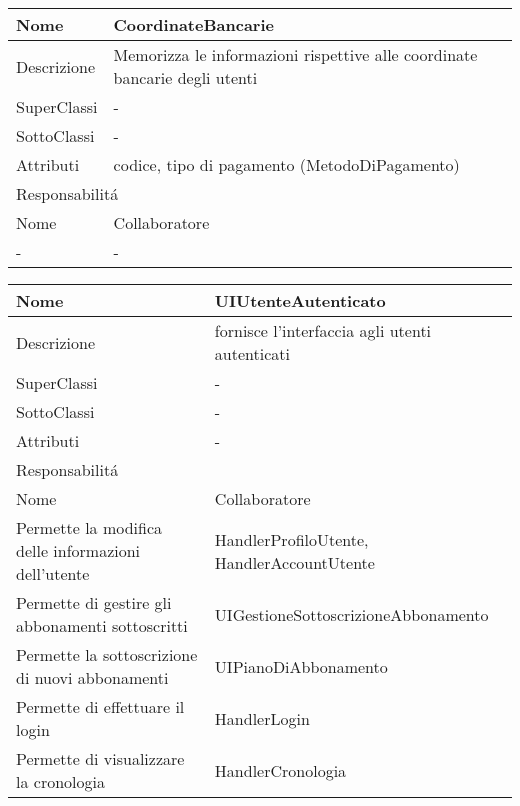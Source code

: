 \begin{center} %
    \begin{longtable}{ |p{3cm}|p{3cm}|p{3cm}|p{3cm}| }
        \hline
        Nome & \multicolumn{3}{|p{9cm}|}{CoordinateBancarie} \\\hline
        Descrizione & \multicolumn{3}{|p{9cm}|}{Memorizza le informazioni rispettive alle coordinate bancarie degli utenti} \\\hline
        SuperClassi & \multicolumn{3}{|p{9cm}|}{-} \\\hline
        SottoClassi & \multicolumn{3}{|p{9cm}|}{-} \\\hline
        Attributi & \multicolumn{3}{|p{9cm}|}{codice, tipo di pagamento (MetodoDiPagamento)} \\\hline
        \multicolumn{4}{|p{12cm}|}{Responsabilit\'a} \\\hline %
        \multicolumn{2}{|p{6cm}|}{Nome} & \multicolumn{2}{|p{6cm}|}{Collaboratore} \\\hline %
        \multicolumn{2}{|p{6cm}|}{-} & \multicolumn{2}{|p{6cm}|}{-} \\\hline
    \end{longtable}
\end{center}

\begin{center} %
    \begin{longtable}{ |p{3cm}|p{3cm}|p{3cm}|p{3cm}| }
        \hline
        Nome & \multicolumn{3}{|p{9cm}|}{UIUtenteAutenticato} \\\hline
        Descrizione & \multicolumn{3}{|p{9cm}|}{fornisce l'interfaccia agli utenti autenticati} \\\hline
        SuperClassi & \multicolumn{3}{|p{9cm}|}{-} \\\hline
        SottoClassi & \multicolumn{3}{|p{9cm}|}{-} \\\hline
        Attributi & \multicolumn{3}{|p{9cm}|}{-} \\\hline
        \multicolumn{4}{|p{12cm}|}{Responsabilit\'a} \\\hline %
        \multicolumn{2}{|p{6cm}|}{Nome} & \multicolumn{2}{|p{6cm}|}{Collaboratore} \\\hline %
        \multicolumn{2}{|p{6cm}|}{Permette la modifica delle informazioni dell'utente} & \multicolumn{2}{|p{6cm}|}{HandlerProfiloUtente, HandlerAccountUtente} \\\hline
        \multicolumn{2}{|p{6cm}|}{Permette di gestire gli abbonamenti sottoscritti} & \multicolumn{2}{|p{6cm}|}{UIGestioneSottoscrizioneAbbonamento} \\\hline
        \multicolumn{2}{|p{6cm}|}{Permette la sottoscrizione di nuovi abbonamenti} & \multicolumn{2}{|p{6cm}|}{UIPianoDiAbbonamento} \\\hline
        \multicolumn{2}{|p{6cm}|}{Permette di effettuare il login} & \multicolumn{2}{|p{6cm}|}{HandlerLogin} \\\hline
        \multicolumn{2}{|p{6cm}|}{Permette di visualizzare la cronologia} & \multicolumn{2}{|p{6cm}|}{HandlerCronologia} \\\hline
    \end{longtable}
\end{center}

